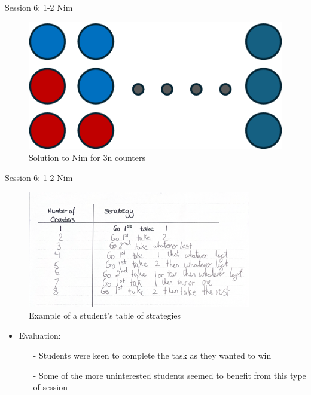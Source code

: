 \documentclass{beamer}  %
\begin{document}
\begin{frame}{Session 6: 1-2 Nim}
    \begin{figure}
        \includegraphics[scale = 1]{Images/Nim_solution.png}
        \caption{Solution to Nim for 3n counters}
    \end{figure}
\end{frame}

\begin{frame}{Session 6: 1-2 Nim}
    \begin{figure}
        \includegraphics[scale = 0.6]{Images/1-2Nim.png}
        \caption{Example of a student's table of strategies}
    \end{figure} 
            \begin{itemize}
                \item Evaluation:
                \begin{itemize}
                    \item[-] Students were keen to complete the task as they wanted to win
                    \item[-] Some of the more uninterested students seemed to benefit from this type of session
                \end{itemize}
            \end{itemize}

\end{frame}
\end{document}
